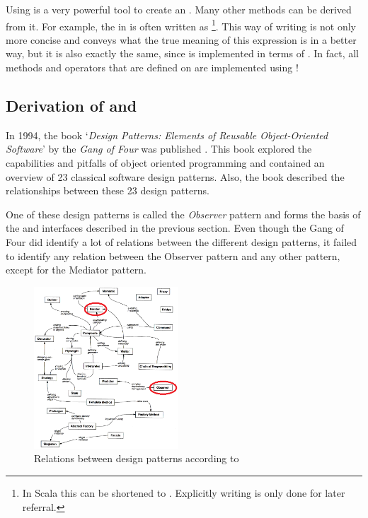 Using  is a very powerful tool to create an \obs. Many other methods can be derived from it. For example, the \obs in  is often written as \footnote{In Scala this can be shortened to . Explicitly writing  is only done for later referral.}. This way of writing is not only more concise and conveys what the true meaning of this expression is in a better way, but it is also exactly the same, since  is implemented in terms of . In fact, all methods and operators that are defined on \obs are implemented using !

\subsection{Derivation of \obs and \obv}
\label{subsec:derivation}
In 1994, the book `\textit{Design Patterns: Elements of Reusable Object-Oriented Software}' by the \textit{Gang of Four} was published \cite{gamma1994-DesignPatternsGOF}. This book explored the capabilities and pitfalls of object oriented programming and contained an overview of 23 classical software design patterns. Also, the book described the relationships between these 23 design patterns.

One of these design patterns is called the \textit{Observer} pattern and forms the basis of the \obs and \obv interfaces described in the previous section. Even though the Gang of Four did identify a lot of relations between the different design patterns, it failed to identify any relation between the Observer pattern and any other pattern, except for the Mediator pattern.

\begin{figure}[H]
	\begin{center}
		\includegraphics[width=0.48\textwidth]{figures/DesignPatternRelationships_bew.png}
	\end{center}
	\caption{Relations between design patterns according to \cite{gamma1994-DesignPatternsGOF}}
	\label{fig:designPatternRelationships}
\end{figure}

